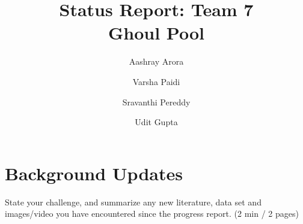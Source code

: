 \documentclass[runningheads]{llncs}
\newcommand{\keywords}[1]{\par\addvspace\baselineskip
\noindent\keywordname\enspace\ignorespaces#1}
\newcommand{\swallow}[1]{ }
\begin{document}
\mainmatter  %

\title{Status Report: Team 7\\
Ghoul Pool}


%
%
\author{Aashray Arora \and Varsha Paidi \and Sravanthi Pereddy \and Udit Gupta}
%


%
%

\maketitle

\swallow{   %
\begin{abstract}
The abstract should summarize the contents of the paper and should
contain at least 70 and at most 150 words. It should be written using the
\emph{abstract} environment.
\keywords{We would like to encourage you to list your keywords within
the abstract section}
\end{abstract}
}


\section{Background Updates} 
State your challenge, and summarize any new literature, data set and images/video you have encountered since the progress report.  (2 min / 2 pages)
\end{document}
